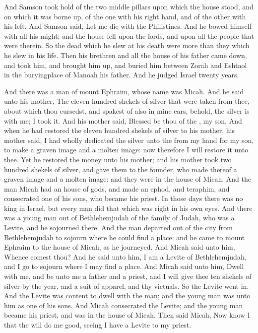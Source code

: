 \begin{biblechapter}
\verse And Samson took hold of the two middle pillars upon which the house stood, and on which it was borne up, of the one with his right hand, and of the other with his left.
\verse And Samson said, Let me die with the Philistines. And he bowed himself with all his might; and the house fell upon the lords, and upon all the people that were therein. So the dead which he slew at his death were more than they which he slew in his life.
\verse Then his brethren and all the house of his father came down, and took him, and brought him up, and buried him between Zorah and Eshtaol in the buryingplace of Manoah his father. And he judged Israel twenty years.
\end{biblechapter}

\begin{biblechapter} %
 And there was a man of mount Ephraim, whose name was Micah.
\verse And he said unto his mother, The eleven hundred shekels of silver that were taken from thee, about which thou cursedst, and spakest of also in mine ears, behold, the silver is with me; I took it. And his mother said, Blessed be thou of the \LORD, my son.
\verse And when he had restored the eleven hundred shekels of silver to his mother, his mother said, I had wholly dedicated the silver unto the \LORD from my hand for my son, to make a graven image and a molten image: now therefore I will restore it unto thee.
\verse Yet he restored the money unto his mother; and his mother took two hundred shekels of silver, and gave them to the founder, who made thereof a graven image and a molten image: and they were in the house of Micah.
\verse And the man Micah had an house of gods, and made an ephod, and teraphim, and consecrated one of his sons, who became his priest.
\verse In those days there was no king in Israel, but every man did that which was right in his own eyes.
\verse And there was a young man out of Bethlehemjudah of the family of Judah, who was a Levite, and he sojourned there.
\verse And the man departed out of the city from Bethlehemjudah to sojourn where he could find a place: and he came to mount Ephraim to the house of Micah, as he journeyed.
\verse And Micah said unto him, Whence comest thou? And he said unto him, I am a Levite of Bethlehemjudah, and I go to sojourn where I may find a place.
\verse And Micah said unto him, Dwell with me, and be unto me a father and a priest, and I will give thee ten shekels of silver by the year, and a suit of apparel, and thy victuals. So the Levite went in.
\verse And the Levite was content to dwell with the man; and the young man was unto him as one of his sons.
\verse And Micah consecrated the Levite; and the young man became his priest, and was in the house of Micah.
\verse Then said Micah, Now know I that the \LORD will do me good, seeing I have a Levite to my priest.
\end{biblechapter}

